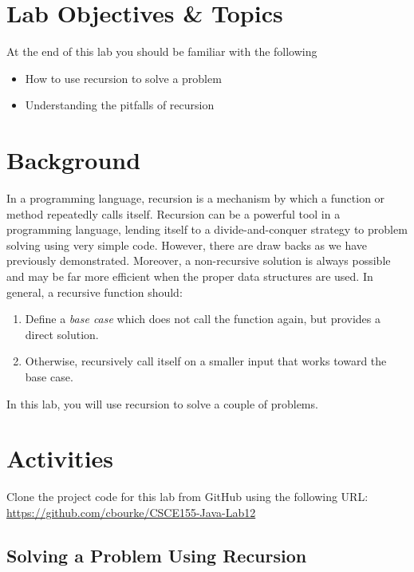 \documentclass[12pt]{scrartcl}
\begin{document}
\section{Lab Objectives \& Topics}
At the end of this lab you should be familiar with the following
\begin{itemize}
  \item How to use recursion to solve a problem
  \item Understanding the pitfalls of recursion
\end{itemize}

\section{Background}

In a programming language, recursion is a mechanism by which 
a function or method repeatedly calls itself.  Recursion can be a 
powerful tool in a programming language, lending itself to a 
divide-and-conquer strategy to problem solving using very simple 
code.  However, there are draw backs as we have previously 
demonstrated.  Moreover, a non-recursive solution is always 
possible and may be far more efficient when the proper data 
structures are used.  In general, a recursive function should:
\begin{enumerate}
  \item Define a \emph{base case} which does not call the 
	function again, but provides a direct solution.
  \item Otherwise, recursively call itself on a smaller input that 
	works toward the base case. 
\end{enumerate}
	
In this lab, you will use recursion to solve a couple of problems.

\section{Activities}

Clone the project code for this lab from GitHub using the following 
URL: \url{https://github.com/cbourke/CSCE155-Java-Lab12}

\subsection{Solving a Problem Using Recursion}
\end{document}
